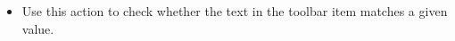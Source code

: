 
\begin{itemize}
\item Use this action to check whether the text in the toolbar item  matches a given value. 
\end{itemize}
